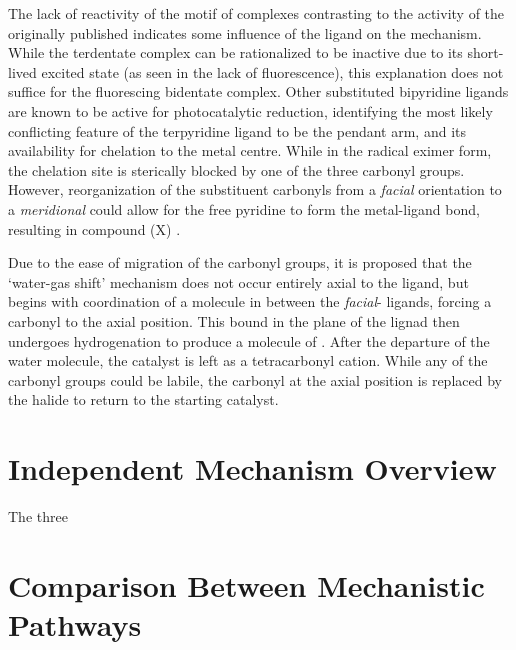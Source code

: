 The lack of reactivity of the  motif of complexes contrasting to the activity of the originally published  indicates some influence of the ligand on the mechanism. While the terdentate complex can be rationalized to be inactive due to its short-lived excited state (as seen in the lack of fluorescence), this explanation does not suffice for the fluorescing bidentate complex. Other substituted bipyridine ligands are known to be active for photocatalytic reduction, identifying the most likely conflicting feature of the terpyridine ligand to be the pendant arm, and its availability for chelation to the metal centre. While in the radical eximer form, the chelation site is sterically blocked by one of the three carbonyl groups. However, reorganization of the substituent carbonyls from a \textit{facial} orientation to a \textit{meridional} could allow for the free pyridine to form the metal-ligand bond, resulting in compound (X) . 

Due to the ease of migration of the carbonyl groups, it is proposed that the `water-gas shift' mechanism does not occur entirely axial to the ligand, but begins with coordination of a  molecule in between the \textit{facial}- ligands, forcing a carbonyl to the axial position. This  bound in the plane of the lignad then undergoes hydrogenation to produce a molecule of . After the departure of the water molecule, the catalyst is left as a tetracarbonyl cation. While any of the carbonyl groups could be labile, the carbonyl at the axial position is replaced by the halide to return to the starting catalyst\autocite{shaver1992}. 

\section{Independent Mechanism Overview} \label{sec.independant}



The three 
\section{Comparison Between Mechanistic Pathways} \label{sec.compare}

